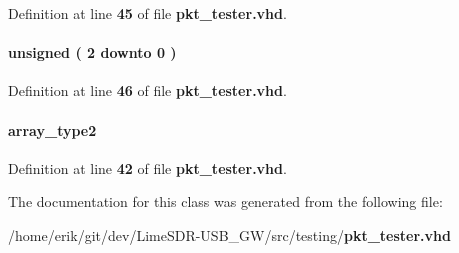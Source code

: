 Definition at line {\bf 45} of file {\bf pkt\+\_\+tester.\+vhd}.

\paragraph[{smpl\+\_\+cnt}]{ {\bfseries \textcolor{comment}{unsigned}\textcolor{vhdlchar}{ }\textcolor{vhdlchar}{(}\textcolor{vhdlchar}{ }\textcolor{vhdlchar}{ } \textcolor{vhdldigit}{2} \textcolor{vhdlchar}{ }\textcolor{keywordflow}{downto}\textcolor{vhdlchar}{ }\textcolor{vhdlchar}{ } \textcolor{vhdldigit}{0} \textcolor{vhdlchar}{ }\textcolor{vhdlchar}{)}\textcolor{vhdlchar}{ }} \hspace{0.3cm}{\ttfamily [Signal]}}\label{classpkt__tester_1_1arch_a58dde194050420fa7c1fc05983437a77}


Definition at line {\bf 46} of file {\bf pkt\+\_\+tester.\+vhd}.

\paragraph[{test\+\_\+data}]{ {\bfseries {\bfseries {\bf array\+\_\+type2}} \textcolor{vhdlchar}{ }} \hspace{0.3cm}{\ttfamily [Signal]}}\label{classpkt__tester_1_1arch_af6bc1419de643ef1dc2dd14209bfb529}


Definition at line {\bf 42} of file {\bf pkt\+\_\+tester.\+vhd}.



The documentation for this class was generated from the following file\+:\begin{DoxyCompactItemize}
\item 
/home/erik/git/dev/\+Lime\+S\+D\+R-\/\+U\+S\+B\+\_\+\+G\+W/src/testing/{\bf pkt\+\_\+tester.\+vhd}\end{DoxyCompactItemize}
